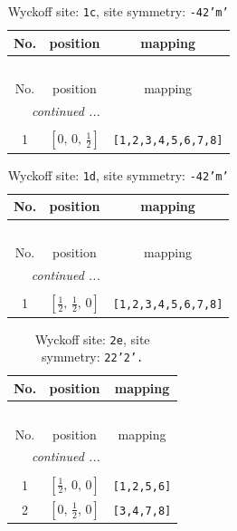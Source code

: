 \documentclass[fleqn,8pt]{jsarticle}
\begin{document}
\begin{longtable}{ccc}
\caption{Wyckoff site: {\tt 1c}, site symmetry: {\tt -42'm'}}
 \\
 \hline \hline
No. & position & mapping \\ \hline \endfirsthead

\multicolumn{2}{l}{\tablename\ \thetable{}} \\
 \hline \hline
No. & position & mapping \\ \hline \endhead

 \hline \hline
\multicolumn{2}{r}{\footnotesize\it continued ...} \\ \endfoot

 \hline \hline
\multicolumn{2}{r}{} \\ \endlastfoot

1 & $\left[ 0,\, 0,\, \frac{1}{2} \right]$ & {\tt [1,2,3,4,5,6,7,8]} \\
\end{longtable}
\renewcommand{\arraystretch}{1.2}
\begin{longtable}{ccc}
\caption{Wyckoff site: {\tt 1d}, site symmetry: {\tt -42'm'}}
 \\
 \hline \hline
No. & position & mapping \\ \hline \endfirsthead

\multicolumn{2}{l}{\tablename\ \thetable{}} \\
 \hline \hline
No. & position & mapping \\ \hline \endhead

 \hline \hline
\multicolumn{2}{r}{\footnotesize\it continued ...} \\ \endfoot

 \hline \hline
\multicolumn{2}{r}{} \\ \endlastfoot

1 & $\left[ \frac{1}{2},\, \frac{1}{2},\, 0 \right]$ & {\tt [1,2,3,4,5,6,7,8]} \\
\end{longtable}
\renewcommand{\arraystretch}{1.2}
\begin{longtable}{ccc}
\caption{Wyckoff site: {\tt 2e}, site symmetry: {\tt 22'2'.}}
 \\
 \hline \hline
No. & position & mapping \\ \hline \endfirsthead

\multicolumn{2}{l}{\tablename\ \thetable{}} \\
 \hline \hline
No. & position & mapping \\ \hline \endhead

 \hline \hline
\multicolumn{2}{r}{\footnotesize\it continued ...} \\ \endfoot

 \hline \hline
\multicolumn{2}{r}{} \\ \endlastfoot

1 & $\left[ \frac{1}{2},\, 0,\, 0 \right]$ & {\tt [1,2,5,6]} \\ \hline
2 & $\left[ 0,\, \frac{1}{2},\, 0 \right]$ & {\tt [3,4,7,8]} \\
\end{longtable}
\end{document}
